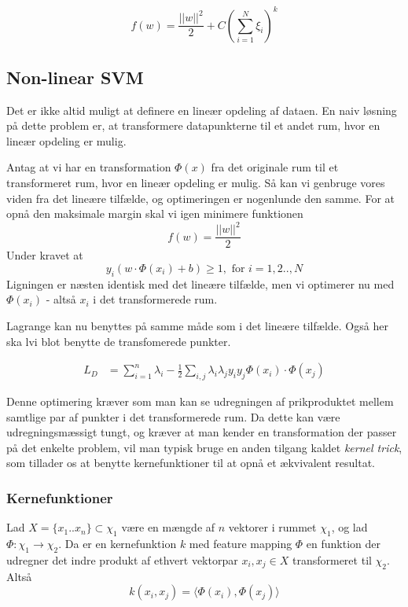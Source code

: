 \documentclass{article}
\begin{document}
$$f(w) = \frac{||w||^2}{2}+C(\sum\limits_{i=1}^N \xi_i)^k$$

\subsection{Non-linear SVM}
Det er ikke altid muligt at definere en lineær opdeling af dataen. En naiv løsning på dette problem er, at transformere datapunkterne til et andet rum, hvor en lineær opdeling er mulig.

Antag at vi har en transformation $\Phi(x)$ fra det originale rum til et transformeret rum, hvor en lineær opdeling er mulig. Så kan vi genbruge vores viden fra det lineære tilfælde, og optimeringen er nogenlunde den samme. For at opnå den maksimale margin skal vi igen minimere funktionen 
$$f(w)=\frac{||w||^2}{2}$$
Under kravet at
$$y_i(w\cdot\Phi(x_i)+b)\geq 1,\text{ for }i=1,2..,N$$
Ligningen er næsten identisk med det lineære tilfælde, men vi optimerer nu med $\Phi(x_i)$ - altså $x_i$ i det transformerede rum.

Lagrange kan nu benyttes på samme måde som i det lineære tilfælde. Også her ska lvi blot benytte de transfomerede punkter.

\begin{align*}
L_D&=\sum_{i=1}^{n}\lambda_i-\frac{1}{2}\sum_{i,j}\lambda_i\lambda_j y_iy_j\Phi(x_i)\cdot\Phi(x_j)
\end{align*}

Denne optimering kræver som man kan se udregningen af prikproduktet mellem samtlige par af punkter i det transformerede rum. Da dette kan være udregningsmæssigt tungt, og kræver at man kender en transformation der passer på det enkelte problem, vil man typisk bruge en anden tilgang kaldet \textit{kernel trick}, som tillader os at benytte kernefunktioner til at opnå et ækvivalent resultat.


\subsubsection{Kernefunktioner}
Lad $X=\{x_1..x_n\}\subset \chi_1$ være en mængde af $n$ vektorer i rummet $\chi_1$, og lad $\Phi:\chi_1\rightarrow\chi_2$. Da er en kernefunktion $k$ med feature mapping $\Phi$ en funktion der udregner det indre produkt af ethvert vektorpar $x_i,x_j\in X$ transformeret til $\chi_2$. Altså
\begin{equation}
k(x_i,x_j)=\langle\Phi(x_i),\Phi(x_j)\rangle
\end{equation}
\end{document}
